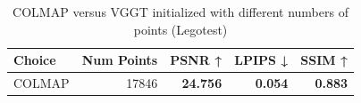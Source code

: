 \begin{table}[H]
\caption{COLMAP versus VGGT initialized with different numbers of points (Legotest)}
\label{tab:02_num_points_legotest}
\begin{tabular}{lrrrr}
\toprule
Choice & Num Points & PSNR ↑ & LPIPS ↓ & SSIM ↑ \\
\midrule
COLMAP & 17846 & \textbf{24.756} & \textbf{0.054} & \textbf{0.883} \\
\bottomrule
\end{tabular}
\end{table}
